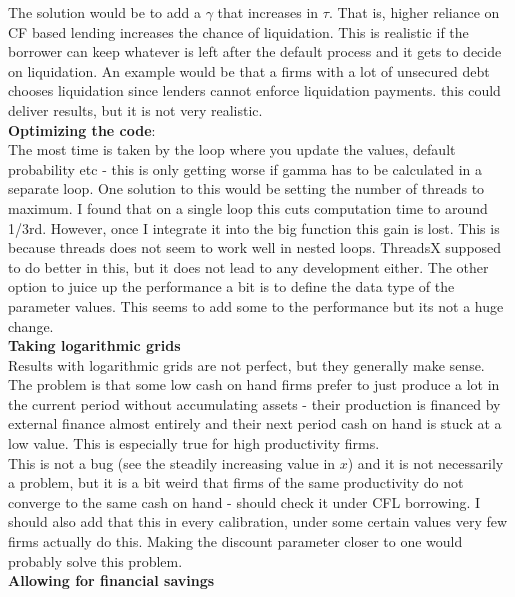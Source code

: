 \documentclass[12pt]{article}
\begin{document}
The solution would be to add a $\gamma$ that increases in $\tau$. That is, higher reliance on CF based lending increases the chance of liquidation. This is realistic if the borrower can keep whatever is left after the default process and it gets to decide on liquidation. An example would be that a firms with a lot of unsecured debt chooses liquidation since lenders cannot enforce liquidation payments. this could deliver results, but it is not very realistic. \vspace{3mm} \\
\textbf{Optimizing the code}: \\
The most time is taken by the loop where you update the values, default probability etc - this is only getting worse if gamma has to be calculated in a separate loop. One solution to this would be setting the number of threads to maximum. I found that on a single loop this cuts computation time to around 1/3rd. However, once I integrate it into the big function this gain is lost. This is because threads does not seem to work well in nested loops. ThreadsX supposed to do better in this, but it does not lead to any development either.  The other option to juice up the performance a bit is to define the data type of the parameter values. This seems to add some to the performance but its not a huge change.
\vspace{3mm}\\
\textbf{Taking logarithmic grids} \\
Results with logarithmic grids are not perfect, but they generally make sense. The problem is that some low cash on hand firms prefer to just produce a lot in the current period without accumulating assets - their production is financed by external finance almost entirely and their next period cash on hand is stuck at a low value.  This is especially true for high productivity firms. \vspace{3mm} \\
This is not a bug (see the steadily increasing value in $x$) and it is not necessarily a problem, but it is a bit weird that firms of the same productivity do not converge to the same cash on hand - should check it under CFL borrowing. I should also add that this in every calibration, under some certain values very few firms actually do this. Making the discount parameter closer to one would probably solve this problem.   \vspace{3mm} \\
\textbf{Allowing for financial savings} \\
\end{document}
